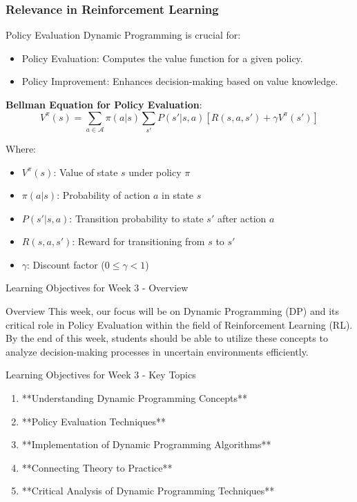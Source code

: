 \documentclass[aspectratio=169]{beamer}
\begin{document}
\begin{frame}[fragile]
    \frametitle{Relevance in Reinforcement Learning}
    \begin{block}{Policy Evaluation}
        Dynamic Programming is crucial for:
        \begin{itemize}
            \item Policy Evaluation: Computes the value function for a given policy.
            \item Policy Improvement: Enhances decision-making based on value knowledge.
        \end{itemize}
        
        \textbf{Bellman Equation for Policy Evaluation}:
        \begin{equation}
            V^{\pi}(s) = \sum_{a \in \mathcal{A}} \pi(a|s) \sum_{s'} P(s'|s, a) [R(s, a, s') + \gamma V^{\pi}(s')]
        \end{equation}

        Where:
        \begin{itemize}
            \item $V^{\pi}(s)$: Value of state $s$ under policy $\pi$
            \item $\pi(a|s)$: Probability of action $a$ in state $s$
            \item $P(s'|s, a)$: Transition probability to state $s'$ after action $a$
            \item $R(s, a, s')$: Reward for transitioning from $s$ to $s'$
            \item $\gamma$: Discount factor ($0 \leq \gamma < 1$)
        \end{itemize}
    \end{block}
\end{frame}

\begin{frame}{Learning Objectives for Week 3 - Overview}
    \begin{block}{Overview}
        This week, our focus will be on Dynamic Programming (DP) and its critical role in Policy Evaluation within the field of Reinforcement Learning (RL). By the end of this week, students should be able to utilize these concepts to analyze decision-making processes in uncertain environments efficiently.
    \end{block}
\end{frame}

\begin{frame}{Learning Objectives for Week 3 - Key Topics}
    \begin{enumerate}
        \item **Understanding Dynamic Programming Concepts**
        \item **Policy Evaluation Techniques**
        \item **Implementation of Dynamic Programming Algorithms**
        \item **Connecting Theory to Practice**
        \item **Critical Analysis of Dynamic Programming Techniques**
    \end{enumerate}
\end{frame}
\end{document}
